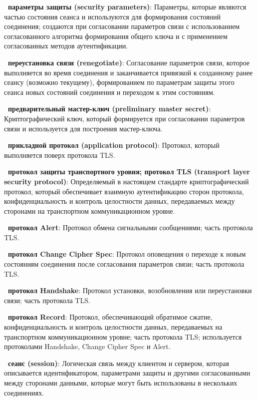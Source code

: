 {\bf \thedefctr~параметры защиты (security parameters)}:
Параметры, которые являются частью состояния сеанса и используются для 
формирования состояний соединения; создаются при согласовании параметров 
связи с использованием согласованного алгоритма формирования общего ключа 
и с применением согласованных методов аутентификации. 

{\bf \thedefctr~переустановка связи (renegotiate)}:
Согласование параметров связи, которое выполняется во время соединения и 
заканчивается привязкой к созданному ранее сеансу (возможно текущему), 
формированием по параметрам защиты этого сеанса новых состояний соединения 
и переходом к этим состояниям. 

{\bf \thedefctr~предварительный мастер-ключ (preliminary master secret)}:
Криптографический ключ, который формируется при согласовании параметров 
связи и используется для построения мастер-ключа. 

{\bf \thedefctr~прикладной протокол (application protocol)}:
Протокол, который выполняется поверх протокола TLS.

{\bf \thedefctr~протокол защиты транспортного уровня; протокол TLS 
(transport layer security protocol)}: 
Определяемый в настоящем стандарте криптографический протокол, который 
обеспечивает взаимную аутентификацию сторон протокола, конфиденциальность 
и контроль целостности данных, передаваемых между сторонами на 
транспортном коммуникационном уровне. 

{\bf \thedefctr~протокол Alert}:
Протокол обмена сигнальными сообщениями; часть протокола TLS. 

{\bf \thedefctr~протокол Change Cipher Spec}:
Протокол оповещения о переходе к новым состояниям соединения после 
согласования параметров связи; часть протокола TLS. 

{\bf \thedefctr~протокол Handshake}:
Протокол установки, возобновления или переустановки связи; часть протокола 
TLS. 

{\bf \thedefctr~протокол Record}:
Протокол, обеспечивающий обратимое сжатие, конфиденциальность и контроль 
целостности данных, передаваемых на транспортном коммуникационном уровне; 
часть протокола TLS; используется протоколами Handshake, Change Cipher 
Spec и Alert. 

{\bf \thedefctr~сеанс (session)}:
Логическая связь между клиентом и сервером, которая описывается 
идентификатором, параметрами защиты и другими согласованными между 
сторонами данными, которые могут быть использованы в нескольких 
соединениях. 

